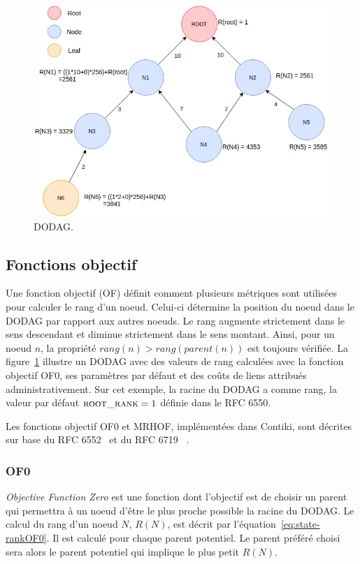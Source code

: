     \begin{figure}[H]
        \centering
        \includegraphics[scale=0.45]{res/pictures/dodag.drawio.png}
        \caption{DODAG.}
        \label{fig:state-dodag}
    \end{figure}


\subsection*{Fonctions objectif}
Une fonction objectif (OF) définit comment plusieurs métriques sont utilisées pour calculer le rang d'un noeud. Celui-ci détermine la position du noeud dans le DODAG par rapport aux autres noeuds.
Le rang augmente strictement dans le sens descendant et diminue strictement dans le sens montant. Ainsi, pour un noeud $n$, la propriété $rang(n)>rang(parent(n))$ est toujours vérifiée. La figure~\ref{fig:state-dodag} illustre un DODAG avec des valeurs de rang calculées avec la fonction objectif OF0, ses paramètres par défaut et des coûts de liens attribués administrativement. Sur cet exemple, la racine du DODAG a comme rang, la valeur par défaut $\textsc{root\_rank}=1$ définie dans le RFC 6550.

Les fonctions objectif OF0 et MRHOF, implémentées dans Contiki, sont décrites sur base du RFC 6552~\cite{rfc:of0} et du RFC 6719 ~\cite{rfc:mrhof}.

    \subsubsection*{OF0}\label{subsec:etat_art:rpl:Of0}
        \textit{Objective Function Zero} est une fonction dont l'objectif est de choisir un parent qui permettra à un noeud d'être le plus proche possible la racine du DODAG.
        Le calcul du rang d'un noeud $N$, $R(N)$, est décrit par l'équation~\ref{eq:state-rankOF0}. Il est calculé pour chaque parent potentiel. Le parent préféré choisi sera alors le parent potentiel qui implique le plus petit $R(N)$.\par


